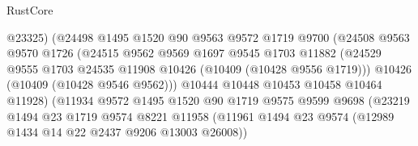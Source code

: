 \begin{lexlean}{RustCore}
\begin{coremodule}
                                    @23325)
                                  (@24498
                                    @1495
                                    @1520
                                    @90
                                    @9563
                                    @9572
                                    @1719
                                    @9700
                                    (@24508
                                      @9563
                                      @9570
                                      @1726
                                      (@24515
                                        @9562
                                        @9569
                                        @1697
                                        @9545
                                        @1703
                                        @11882
                                        (@24529
                                          @9555
                                          @1703
                                          @24535
                                          @11908
                                          @10426
                                          (@10409 (@10428 @9556 @1719)))
                                        @10426
                                        (@10409 (@10428 @9546 @9562)))
                                      @10444
                                      @10448
                                      @10453
                                      @10458
                                      @10464
                                      @11928)
                                    (@11934
                                      @9572
                                      @1495
                                      @1520
                                      @90
                                      @1719
                                      @9575
                                      @9599
                                      @9698
                                      (@23219
                                        @1494
                                        @23
                                        @1719
                                        @9574
                                        @8221
                                        @11958
                                        (@11961
                                          @1494
                                          @23
                                          @9574
                                          (@12989 @1434 @14 @22 @2437 @9206 @13003 @26008))

\end{coremodule}
\end{lexlean}

